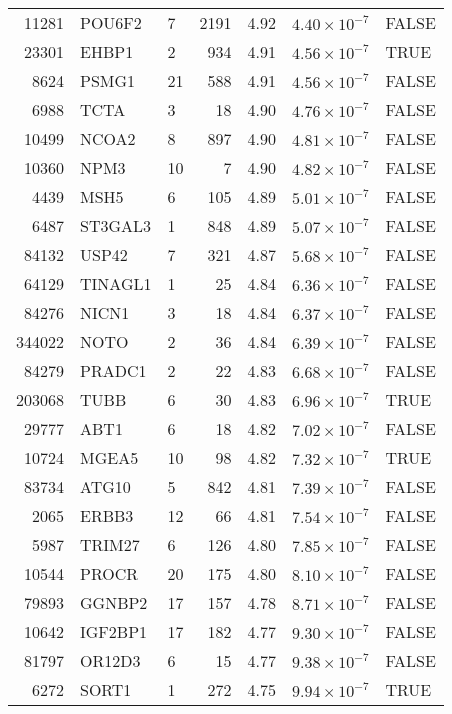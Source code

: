 \begin{table}[ht]
\begin{adjustbox}{totalheight=10in}
\begin{tabular}{rllrrrl}
  11281 & POU6F2 & 7 & 2191 & 4.92 & $4.40 \times 10^{-7}$ & FALSE \\ 
  23301 & EHBP1 & 2 & 934 & 4.91 & $4.56 \times 10^{-7}$ & TRUE \\ 
  8624 & PSMG1 & 21 & 588 & 4.91 & $4.56 \times 10^{-7}$ & FALSE \\ 
  6988 & TCTA & 3 &  18 & 4.90 & $4.76 \times 10^{-7}$ & FALSE \\ 
  10499 & NCOA2 & 8 & 897 & 4.90 & $4.81 \times 10^{-7}$ & FALSE \\ 
  10360 & NPM3 & 10 &   7 & 4.90 & $4.82 \times 10^{-7}$ & FALSE \\ 
  4439 & MSH5 & 6 & 105 & 4.89 & $5.01 \times 10^{-7}$ & FALSE \\ 
  6487 & ST3GAL3 & 1 & 848 & 4.89 & $5.07 \times 10^{-7}$ & FALSE \\ 
  84132 & USP42 & 7 & 321 & 4.87 & $5.68 \times 10^{-7}$ & FALSE \\ 
  64129 & TINAGL1 & 1 &  25 & 4.84 & $6.36 \times 10^{-7}$ & FALSE \\ 
  84276 & NICN1 & 3 &  18 & 4.84 & $6.37 \times 10^{-7}$ & FALSE \\ 
  344022 & NOTO & 2 &  36 & 4.84 & $6.39 \times 10^{-7}$ & FALSE \\ 
  84279 & PRADC1 & 2 &  22 & 4.83 & $6.68 \times 10^{-7}$ & FALSE \\ 
  203068 & TUBB & 6 &  30 & 4.83 & $6.96 \times 10^{-7}$ & TRUE \\ 
  29777 & ABT1 & 6 &  18 & 4.82 & $7.02 \times 10^{-7}$ & FALSE \\ 
  10724 & MGEA5 & 10 &  98 & 4.82 & $7.32 \times 10^{-7}$ & TRUE \\ 
  83734 & ATG10 & 5 & 842 & 4.81 & $7.39 \times 10^{-7}$ & FALSE \\ 
  2065 & ERBB3 & 12 &  66 & 4.81 & $7.54 \times 10^{-7}$ & FALSE \\ 
  5987 & TRIM27 & 6 & 126 & 4.80 & $7.85 \times 10^{-7}$ & FALSE \\ 
  10544 & PROCR & 20 & 175 & 4.80 & $8.10 \times 10^{-7}$ & FALSE \\ 
  79893 & GGNBP2 & 17 & 157 & 4.78 & $8.71 \times 10^{-7}$ & FALSE \\ 
  10642 & IGF2BP1 & 17 & 182 & 4.77 & $9.30 \times 10^{-7}$ & FALSE \\ 
  81797 & OR12D3 & 6 &  15 & 4.77 & $9.38 \times 10^{-7}$ & FALSE \\ 
  6272 & SORT1 & 1 & 272 & 4.75 & $9.94 \times 10^{-7}$ & TRUE \\ 

\end{tabular}
\end{adjustbox}
\end{table}
